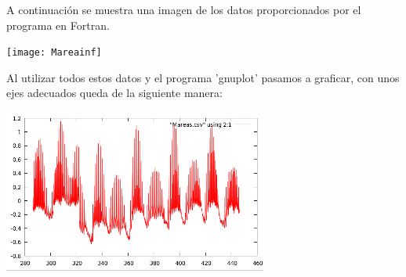 \documentclass[]{article}
\begin{document}
A continuaci\'on se muestra una imagen de los datos proporcionados por el programa en Fortran. 

\begin{center}
\texttt{[image: Mareainf]}\\
\end{center}

Al utilizar todos estos datos y el programa 'gnuplot' pasamos a graficar, con unos ejes adecuados queda de la siguiente manera:
\begin{center}
\includegraphics[scale=1]{GraficaMareas}
\end{center}
\end{document}
